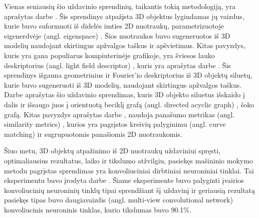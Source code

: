 Vienas seniausių šio uždavinio sprendinių, taikantis tokią metodologiją, yra aprašytas darbe \cite{prevWparEig}. Šis sprendinys atpažįsta 3D objektus lygindamas jų vaizdus, kurie buvo suformuoti iš didelės imties 2D nuotraukų, parametrizuotoje 
eigenerdvėje (angl. eigenspace) %
. Šios nuotraukos buvo sugeneruotos iš 3D modelių naudojant skirtingus apžvalgos taškus ir apšvietimus. 
Kitas pavyzdys, kuris yra gana populiarus kompiuterinėje grafikoje, yra 
šviesos lauko deskriptorius (angl. light field descriptor)%
, kuris yra aprašytas darbe \cite{prevWLightFld}. Šis sprendinys išgauna geometrinius ir 
Fourier'io %
deskriptorius iš 3D objektų siluetų, kurie buvo sugeneruoti iš 3D modelių, naudojant skirtingus apžvalgos taškus. 
Darbe \cite{prevWShockGraph} aprašytas šio uždavinio sprendimas, kuris 3D objekto siluetus išskaido į dalis ir išsaugo juos į 
orientuotą beciklį grafą (angl. directed acyclic graph) %
, šoko grafą. %
Kitas pavyzdys aprašytas darbe \cite{prevWSimMet}, naudoja panašumo metrikas (angl. similarity metrics) %
, kurios yra pagrįstos kreivių palyginimu (angl. curve matching)%
ir sugrupuotomis panašiomis 2D nuotraukomis.

Šiuo metu, 3D objektų atpažinimo iš 2D nuotraukų uždaviniui spręsti, optimaliausius  rezultatus, laiko ir tikslumo atžvilgiu, pasiekęs mašininio mokymo metodu pagrįstas sprendimas yra konvoliuciniai dirbtiniai neuroniniai tinklai. Tai eksperimentu buvo įrodyta darbe \cite{cnnExp1}. Šiame eksperimente buvo palyginti įvairios konvoliucinių neuroninių tinklų tipai sprendžiant šį uždavinį ir geriausią rezultatą pasiekęs tipas buvo
daugiavaizdis (angl. multi-view convolutional network)%
konvoliucinis neuroninis tinklas, kurio tikslumas buvo 90.1\%.
